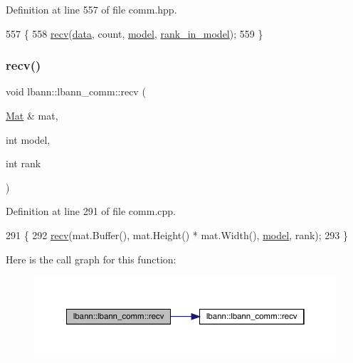 Definition at line 557 of file comm.\+hpp.


\begin{DoxyCode}
557                                                                  \{
558     \hyperlink{classlbann_1_1lbann__comm_af8842cd4cea390f76d9146e1c4578de4}{recv}(\hyperlink{namespacelbann_1_1cnpy__utils_a9ac86d96ccb1f8b4b2ea16441738781f}{data}, count, \hyperlink{namespacelbann_adee41f31f15f3906cbdcce4a1417eb56a20f35e630daf44dbfa4c3f68f5399d8c}{model}, \hyperlink{classlbann_1_1lbann__comm_a0dcccd57c2b591eb7682e192e0a09033}{rank\_in\_model});
559   \}
\end{DoxyCode}
\mbox{\label{classlbann_1_1lbann__comm_ac1ed8dd7b6f839b69bfb33f88728b18d}} 
\subsubsection{\texorpdfstring{recv()}{recv()}\hspace{0.1cm}{\footnotesize\ttfamily [3/9]}}
{\footnotesize\ttfamily void lbann\+::lbann\+\_\+comm\+::recv (\begin{DoxyParamCaption}\item[{\hyperlink{base_8hpp_a68f11fdc31b62516cb310831bbe54d73}{Mat} \&}]{mat,  }\item[{int}]{model,  }\item[{int}]{rank }\end{DoxyParamCaption})}



Definition at line 291 of file comm.\+cpp.


\begin{DoxyCode}
291                                                    \{
292   \hyperlink{classlbann_1_1lbann__comm_af8842cd4cea390f76d9146e1c4578de4}{recv}(mat.Buffer(), mat.Height() * mat.Width(), \hyperlink{namespacelbann_adee41f31f15f3906cbdcce4a1417eb56a20f35e630daf44dbfa4c3f68f5399d8c}{model}, rank);
293 \}
\end{DoxyCode}
Here is the call graph for this function\+:\nopagebreak
\begin{figure}[H]
\begin{center}
\leavevmode
\includegraphics[width=350pt]{classlbann_1_1lbann__comm_ac1ed8dd7b6f839b69bfb33f88728b18d_cgraph}
\end{center}
\end{figure}
\mbox{\label{classlbann_1_1lbann__comm_a1376b4f3c0941e19ff23a8baf30eb63d}} 
